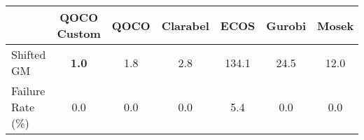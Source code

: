 \begin{tabular}{lcccccc}
  \hline
    & \textbf{QOCO Custom}   & \textbf{QOCO} & \textbf{Clarabel} & \textbf{ECOS} & \textbf{Gurobi} & \textbf{Mosek} \\ \hline
  Shifted GM & \textbf{1.0} & 1.8 & 2.8 & 134.1 & 24.5 & 12.0 \\ 
  Failure Rate (\%) & 0.0 & 0.0 & 0.0 & 5.4 & 0.0 & 0.0 \\ \hline 
\end{tabular}
